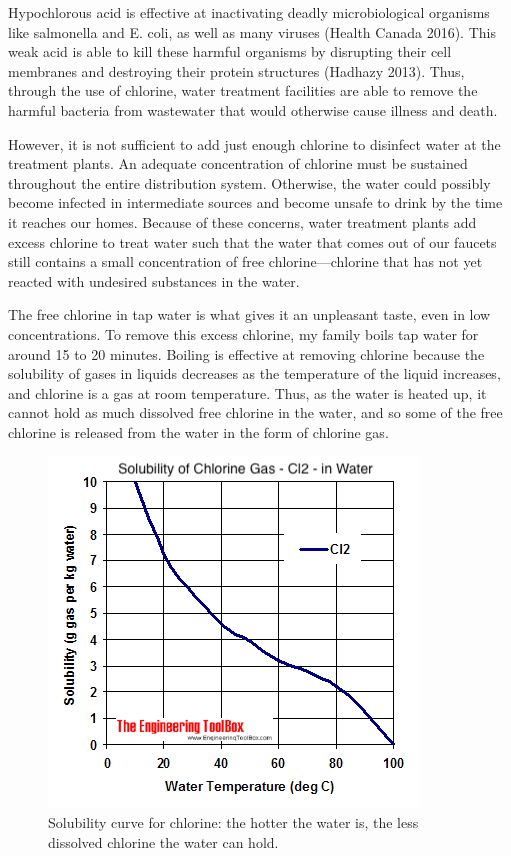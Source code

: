 \documentclass[11pt]{article}
\begin{document}
\centerline{}

Hypochlorous acid is effective at inactivating deadly microbiological organisms like salmonella and E. coli, as well as many viruses (Health Canada 2016). This weak acid is able to kill these harmful organisms by disrupting their cell membranes and destroying their protein structures (Hadhazy 2013). Thus, through the use of chlorine, water treatment facilities are able to remove the harmful bacteria from wastewater that would otherwise cause illness and death.

However, it is not sufficient to add just enough chlorine to disinfect water at the treatment plants. An adequate concentration of chlorine must be sustained throughout the entire distribution system. Otherwise, the water could possibly become infected in intermediate sources and become unsafe to drink by the time it reaches our homes. Because of these concerns, water treatment plants add excess chlorine to treat water such that the water that comes out of our faucets still contains a small concentration of free chlorine—chlorine that has not yet reacted with undesired substances in the water.

The free chlorine in tap water is what gives it an unpleasant taste, even in low concentrations. To remove this excess chlorine, my family boils tap water for around 15 to 20 minutes. Boiling is effective at removing chlorine because the solubility of gases in liquids decreases as the temperature of the liquid increases, and chlorine is a gas at room temperature. Thus, as the water is heated up, it cannot hold as much dissolved free chlorine in the water, and so some of the free chlorine is released from the water in the form of chlorine gas.

\begin{figure}[H]
	\centering
	\caption{Solubility curve for chlorine: the hotter the water is, the less dissolved chlorine the water can hold.}
	\includegraphics[width=0.5\linewidth]{assets/cl-solubility.png}
\end{figure}
\end{document}
